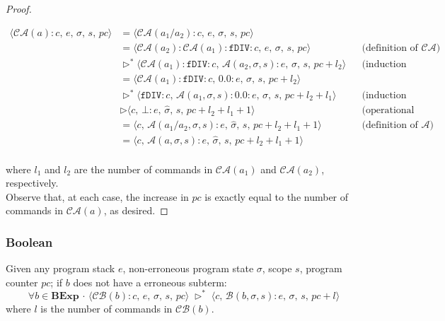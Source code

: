 \documentclass{article}
\begin{document}
\begin{proof}
\begin{itemize}
\begin{itemize}
            \[
              \begin{aligned}
                \langle  \mathcal{CA}(a) : c,\, e,\, \sigma,\, s,\, pc \rangle 
                &= \langle \mathcal{CA}(a_1 / a_2) : c,\, e,\, \sigma,\, s,\, pc \rangle \\
                &= \langle \mathcal{CA}(a_2) : \mathcal{CA}(a_1) : \texttt{fDIV} :  c,\, e,\, \sigma,\, s,\, pc \rangle 
                && \text{(definition of $\mathcal{CA}$)} \\
                &\triangleright^{\ast} \langle \mathcal{CA}(a_1) : \texttt{fDIV} :  c,\, \mathcal{A}(a_2, \sigma, s) : e,\, \sigma,\, s,\, pc + l_2 \rangle 
                && \text{(induction hypothesis 2)} \\
                &= \langle \mathcal{CA}(a_1) : \texttt{fDIV} :  c,\, 0.0 : e,\, \sigma,\, s,\, pc + l_2 \rangle \\
                &\triangleright^{\ast} \langle \texttt{fDIV} :  c,\, \mathcal{A}(a_1, \sigma, s) : 0.0 : e,\, \sigma,\, s,\, pc + l_2 + l_1 \rangle 
                && \text{(induction hypothesis 1)} \\
                &\triangleright \langle c,\, \bot : e,\, \hat{\sigma},\, s,\, pc + l_2 + l_1 + 1 \rangle 
                && \text{(operational semantics)} \\
                &= \langle c,\, \mathcal{A}(a_1 / a_2, \sigma, s) : e,\, \hat{\sigma},\, s,\, pc + l_2 + l_1 + 1 \rangle
                && \text{(definition of $\mathcal{A}$)} \\
                &= \langle c,\, \mathcal{A}(a, \sigma, s) : e,\, \hat{\sigma},\, s,\, pc + l_2 + l_1 + 1 \rangle \\
              \end{aligned}
          \]
            
        \end{itemize}    
\end{itemize}

where $l_1$ and $l_2$ are the number of commands in $\mathcal{CA}(a_1)$ and $\mathcal{CA}(a_2)$, respectively.\\
Observe that, at each case, the increase in $pc$ is exactly equal to the number of commands in $\mathcal{CA}(a)$, as desired.

\end{proof}

\subsubsection{Boolean}
Given any program stack $e$, non-erroneous program state $\sigma$, scope $s$, program counter $pc$; if $b$ does not have a erroneous subterm:
\[
\forall b \in \textbf{BExp} \,\cdot\, \langle \mathcal{CB}(b) : c,\, e,\, \sigma,\, s,\, pc \rangle \; \triangleright^{\ast} \;
\langle c,\, \mathcal{B}(b, \sigma, s) : e,\, \sigma,\, s,\, pc + l \rangle
\] where $l$ is the number of commands in $\mathcal{CB}(b)$.
\end{document}

